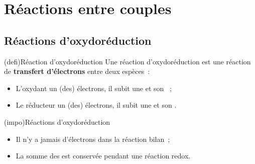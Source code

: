 \documentclass[../../main/main.tex]{subfiles}
\begin{document}
\section{Réactions entre couples}
\subsection{Réactions d'oxydoréduction}
\begin{tcb*}[breakable](defi){Réaction d'oxydoréduction}
	Une réaction d'oxydoréduction est une réaction de \textbf{transfert
		d'électrons} entre deux espèces~:
	\psw{
		\[
			\ce{Ox_1 + Red_2 = Red_1 + Ox_2}
		\]
	}
	\vspace{-25pt}
	\begin{itemize}
		\item L'oxydant  un (des) électrons, il subit une
		       et son \no {}~;
		\item Le réducteur  un (des) électrons, il subit une
		       et son \no {}.
	\end{itemize}
\end{tcb*}

\begin{tcb*}(impo){Réactions d'oxydoréduction}
	\begin{itemize}
		\item Il n'y a jamais d'électrons dans la réaction bilan~;
		\item La somme des \no est conservée pendant une réaction redox.
	\end{itemize}
\end{tcb*}
\end{document}

